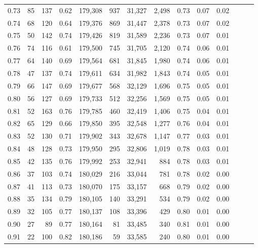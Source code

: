 \begin{tabular}{rrrrrrrrrrrrrr}
0.73 &      85 &  137 &  0.62 &  179,308 &      937 &  31,327 &   2,498 &  0.73 &  0.07 &      0.02 \\
0.74 &      68 &  120 &  0.64 &  179,376 &      869 &  31,447 &   2,378 &  0.73 &  0.07 &      0.02 \\
0.75 &      50 &  142 &  0.74 &  179,426 &      819 &  31,589 &   2,236 &  0.73 &  0.07 &      0.01 \\
0.76 &      74 &  116 &  0.61 &  179,500 &      745 &  31,705 &   2,120 &  0.74 &  0.06 &      0.01 \\
0.77 &      64 &  140 &  0.69 &  179,564 &      681 &  31,845 &   1,980 &  0.74 &  0.06 &      0.01 \\
0.78 &      47 &  137 &  0.74 &  179,611 &      634 &  31,982 &   1,843 &  0.74 &  0.05 &      0.01 \\
0.79 &      66 &  147 &  0.69 &  179,677 &      568 &  32,129 &   1,696 &  0.75 &  0.05 &      0.01 \\
0.80 &      56 &  127 &  0.69 &  179,733 &      512 &  32,256 &   1,569 &  0.75 &  0.05 &      0.01 \\
0.81 &      52 &  163 &  0.76 &  179,785 &      460 &  32,419 &   1,406 &  0.75 &  0.04 &      0.01 \\
0.82 &      65 &  129 &  0.66 &  179,850 &      395 &  32,548 &   1,277 &  0.76 &  0.04 &      0.01 \\
0.83 &      52 &  130 &  0.71 &  179,902 &      343 &  32,678 &   1,147 &  0.77 &  0.03 &      0.01 \\
0.84 &      48 &  128 &  0.73 &  179,950 &      295 &  32,806 &   1,019 &  0.78 &  0.03 &      0.01 \\
0.85 &      42 &  135 &  0.76 &  179,992 &      253 &  32,941 &     884 &  0.78 &  0.03 &      0.01 \\
0.86 &      37 &  103 &  0.74 &  180,029 &      216 &  33,044 &     781 &  0.78 &  0.02 &      0.00 \\
0.87 &      41 &  113 &  0.73 &  180,070 &      175 &  33,157 &     668 &  0.79 &  0.02 &      0.00 \\
0.88 &      35 &  134 &  0.79 &  180,105 &      140 &  33,291 &     534 &  0.79 &  0.02 &      0.00 \\
0.89 &      32 &  105 &  0.77 &  180,137 &      108 &  33,396 &     429 &  0.80 &  0.01 &      0.00 \\
0.90 &      27 &   89 &  0.77 &  180,164 &       81 &  33,485 &     340 &  0.81 &  0.01 &      0.00 \\
0.91 &      22 &  100 &  0.82 &  180,186 &       59 &  33,585 &     240 &  0.80 &  0.01 &      0.00 \\

\end{tabular}

